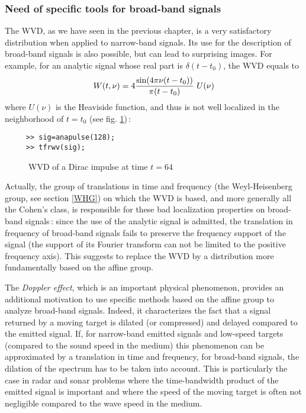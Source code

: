 \subsubsection{Need of specific tools for broad-band signals}

  The WVD, as we have seen in the previous chapter, is a very satisfactory
distribution when applied to narrow-band signals. Its use for the
description of broad-band signals is also possible, but can lead to
surprising images. For example, for an analytic signal whose real part is
$\delta(t-t_0)$, the WVD equals to
\[W(t,\nu)=4{\sin(4\pi\nu(t-t_0))\over\pi(t-t_0)}\ U(\nu)\]
where $U(\nu)$ is the Heaviside function, and thus is not well localized in
the neighborhood of $t=t_0$ (see fig. \ref{En2fig7})\,:
\begin{verbatim}
     >> sig=anapulse(128);
     >> tfrwv(sig); 
\end{verbatim}
\begin{figure}[htb]
\epsfxsize=10cm
\epsfysize=8cm
\centerline{}
\caption{\label{En2fig7}WVD of a Dirac impulse at time $t=64$}
\end{figure}
Actually, the group of translations in time and frequency (the
Weyl-Heisenberg group, see section \ref{WHG}) on which the WVD is based,
and more generally all the Cohen's class, is responsible for these bad
localization properties on broad-band signals\,: since the use of the
analytic signal is admitted, the translation in frequency of broad-band
signals fails to preserve the frequency support of the signal (the support
of its Fourier transform can not be limited to the positive frequency
axis). This suggests to replace the WVD by a distribution more
fundamentally based on the affine group.

 The {\it Doppler effect}, which is an important
physical phenomenon, provides an additional motivation to use specific
methods based on the affine group to analyze broad-band signals. Indeed, it
characterizes the fact that a signal returned by a moving target is dilated
(or compressed) and delayed compared to the emitted signal. If, for
narrow-band emitted signals and low-speed targets (compared to the sound
speed in the medium) this phenomenon can be approximated by a translation
in time and frequency, for broad-band signals, the dilation of the spectrum
has to be taken into account. This is particularly the case in radar and
sonar problems where the time-bandwidth product of the emitted signal is
important and where the speed of the moving target is often not negligible
compared to the wave speed in the medium.


